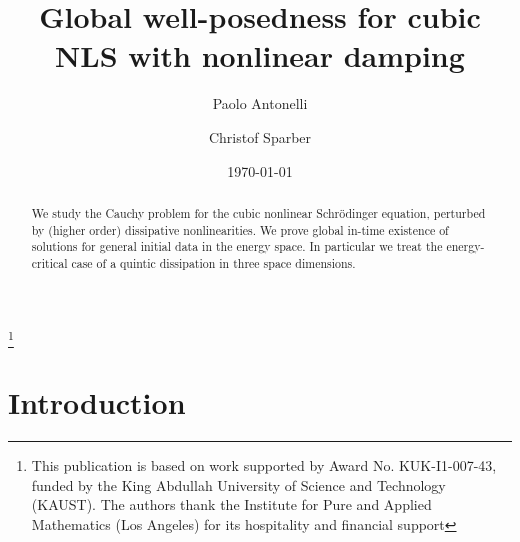 \documentclass[a4paper,leqno]{amsart}
\theoremstyle{plain}
\theoremstyle{definition}
\numberwithin{equation}{section}
\begin{document}
\title[Cubic NLS with nonlinear dissipation]
{Global well-posedness for cubic NLS with nonlinear damping}
\author[P. Antonelli]{Paolo Antonelli}
\address[P. Antonelli]{Department of Applied Mathematics and
Theoretical Physics\\
CMS, Wilberforce Road\\ Cambridge CB3 0WA\\ England}
\author[C. Sparber]{Christof Sparber}
\address[C. Sparber]{Department of Applied Mathematics and Theoretical
Physics\\
CMS, Wilberforce Road\\ Cambridge CB3 0WA\\ England}
\begin{abstract}
We study the Cauchy problem for the cubic nonlinear Schr\"odinger equation, perturbed by (higher order) dissipative nonlinearities.
We prove global in-time existence of solutions for general initial data in the energy space. In particular we treat the 
energy-critical case of a quintic dissipation in three space dimensions.
\end{abstract}

\date{\today}


\thanks{This publication is based on work supported by Award No. KUK-I1-007-43, funded by the King Abdullah University of Science and Technology (KAUST). The authors
thank the Institute for Pure and Applied Mathematics (Los Angeles) for its hospitality and financial support}
\maketitle

\section{Introduction}
\label{sec:intro}
\end{document}
